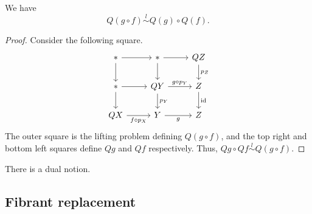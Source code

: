 \documentclass[main.tex]{subfiles}
\begin{document}
\begin{corollary}
  \label{cor:cofibrant_replacement_respects_composition}
  We have
  \begin{equation*}
    Q(g \circ f) \overset{l}{\sim} Q(g) \circ Q(f).
  \end{equation*}
\end{corollary}
\begin{proof}
  Consider the following square.
  \begin{equation*}
    \begin{tikzcd}
      *
      \arrow[r]
      \arrow[d]
      & *
      \arrow[r]
      \arrow[d]
      & QZ
      \arrow[d, "p_{Z}"]
      \\
      *
      \arrow[r]
      \arrow[d]
      & QY
      \arrow[r, "g \circ p_{Y}"]
      \arrow[d, "p_{Y}"]
      & Z
      \arrow[d, "\id"]
      \\
      QX
      \arrow[r, swap, "f \circ p_{X}"]
      & Y
      \arrow[r, swap, "g"]
      & Z
    \end{tikzcd}
  \end{equation*}
  The outer square is the lifting problem defining $Q(g \circ f)$, and the top right and bottom left squares define $Qg$ and $Qf$ respectively. Thus, $Qg \circ Qf \overset{l}{\sim} Q(g \circ f)$.
\end{proof}

There is a dual notion.

\subsection{Fibrant replacement}
\label{ssc:fibrant_replacement}
\end{document}
